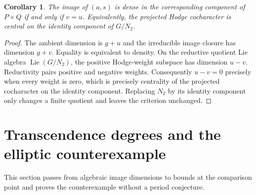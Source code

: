 \documentclass[11pt]{article}
\newtheorem{corollary}[theorem]{Corollary}
\theoremstyle{definition}\newtheorem{definition}[theorem]{Definition}
\theoremstyle{remark}\newtheorem{remark}[theorem]{Remark}
\DeclareMathOperator{\Lie}{Lie}\DeclareMathOperator{\trdeg}{trdeg}
\begin{document}
\begin{corollary}\label{cor:central}
The image of $(a,s)$ is dense in the corresponding component of $P\times Q$ if and only if $v=u$. Equivalently, the projected Hodge cocharacter is central on the identity component of $G/N_2$.
\end{corollary}
\begin{proof}
The ambient dimension is $g+u$ and the irreducible image closure has dimension $g+v$. Equality is equivalent to density. On the reductive quotient Lie algebra $\Lie(G/N_2)$, the positive Hodge-weight subspace has dimension $u-v$. Reductivity pairs positive and negative weights. Consequently $u-v=0$ precisely when every weight is zero, which is precisely centrality of the projected cocharacter on the identity component. Replacing $N_2$ by its identity component only changes a finite quotient and leaves the criterion unchanged.
\end{proof}

\section{Transcendence degrees and the elliptic counterexample}
This section passes from algebraic image dimensions to bounds at the comparison point and proves the counterexample without a period conjecture.
\end{document}
